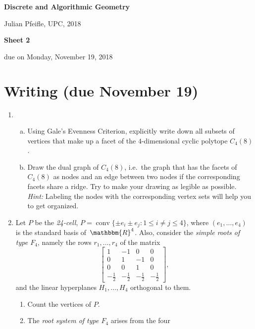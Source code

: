 \documentclass[11pt]{amsart}
\DeclareMathOperator{\conv}{conv}
\newcommand{\RR}{\mathbbm{R}}
\begin{document}
\begin{center}
\textbf{\sffamily
   Discrete and Algorithmic Geometry }

\medskip
   Julian Pfeifle,
   UPC, 2018
\end{center}


\begin{center}
  \textbf{\sffamily Sheet 2}

\bigskip
 due on Monday, November 19, 2018

\end{center}

\bigskip
\bigskip
\bigskip

\section*{Writing (due November 19)}
\begin{enumerate}
\item
  \begin{enumerate}[(a)]
  \item Using Gale's Evenness Criterion, explicitly write down all
    subsets of vertices that make up a facet of the $4$-dimensional
    cyclic polytope $C_4(8)$.
  \item Draw the dual graph of $C_4(8)$, i.e.\ the graph that has the facets of $C_4(8)$ as nodes and an edge between two nodes if the corresponding facets share a ridge.
    Try to make your drawing as legible as possible. \emph{Hint:} Labeling the nodes with the corresponding vertex sets will help you to get organized.
\end{enumerate}
  \bigskip\bigskip
\item Let $P$ be the \emph{24-cell}, $P = \conv\{\pm e_i\pm e_j : 1\le i\ne j\le 4\}$, where $(e_1,\dots,e_4)$ is the standard basis of~$\RR^4$.
 Also, consider the \emph{simple roots of type $F_4$}, namely the rows $r_1,\dots,r_4$ of the matrix
    \[
      \begin{bmatrix}
        1 & -1 & 0 & 0 \\
        0 & 1 & -1 & 0 \\
        0 & 0 & 1 & 0 \\
        -\frac12 & -\frac12 & -\frac12 & -\frac12
      \end{bmatrix},
    \]
    and the linear hyperplanes $H_1,\dots,H_4$ orthogonal to them.
    \begin{enumerate}
      \item Count the vertices of $P$.
      \item The \emph{root system of type $F_4$} arises from the four

\end{enumerate}
\end{enumerate}
\end{document}
